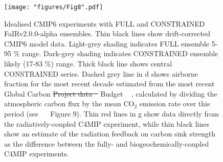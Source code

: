 \documentclass[gmd, manuscript]{copernicus}
\providecommand{\DIFadd}[1]{{\protect\color{blue}#1}} %
\providecommand{\DIFdel}[1]{{\protect\color{red}\sout{#1}}}                      %
\providecommand{\DIFaddend}{} %
\providecommand{\DIFaddFL}[1]{\DIFadd{#1}} %
\providecommand{\DIFdelFL}[1]{\DIFdel{#1}} %
\providecommand{\DIFaddbeginFL}{} %
\providecommand{\DIFaddendFL}{} %
\providecommand{\DIFdelbeginFL}{} %
\providecommand{\DIFdelendFL}{} %
\begin{document}
\DIFaddend \begin{figure}[t]
    \DIFdelbeginFL %
\DIFdelendFL \DIFaddbeginFL \texttt{[image: "figures/Fig8".pdf]}
    \DIFaddendFL \caption{Idealised CMIP6 experiments with FULL and CONSTRAINED FaIRv2.0\DIFaddbeginFL \DIFaddFL{.0-alpha }\DIFaddendFL ensembles. Thin black lines show drift-corrected CMIP6 model data. Light-grey shading indicates FULL ensemble 5-95 \% range. Dark-grey shading indicates CONSTRAINED ensemble \DIFaddbeginFL \DIFaddFL{likely (}\DIFaddendFL 17-83 \%\DIFaddbeginFL \DIFaddFL{) }\DIFaddendFL range. Thick black line shows central CONSTRAINED series. Dashed grey line in d shows airborne fraction for the most recent decade estimated from the \DIFaddbeginFL \DIFaddFL{most recent }\DIFaddendFL Global Carbon \DIFdelbeginFL \DIFdelFL{Project data \mbox{%
\citep{Friedlingstein2019}}\hspace{0pt}%
}\DIFdelendFL \DIFaddbeginFL \DIFaddFL{Budget \mbox{%
\citep{Friedlingstein2020}}\hspace{0pt}%
, calculated by dividing the atmospheric carbon flux by the mean CO$_2$ emission rate over this period (see \mbox{%
\citeauthor{Friedlingstein2020} }\hspace{0pt}%
Figure 9)}\DIFaddendFL . Thin red lines in g show data directly from the radiatively-coupled C4MIP experiment, while thin black lines show an estimate of the radiation feedback on carbon sink strength as the difference between the fully- and biogeochemically-coupled C4MIP experiments.}
    \label{fig:idealisedNROY}
\end{figure}
\clearpage
\end{document}

